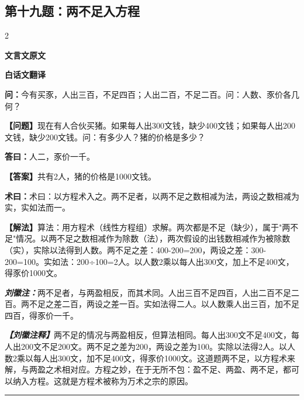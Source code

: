 \documentclass[10pt,a4paper]{article}
\newcommand{\wen}[1]{\textbf{\color{problemcolor}问：}#1\par}
\newcommand{\da}[1]{\textbf{答曰：}#1\par}
\newcommand{\shu}[1]{\textbf{术曰：}#1\par}
\newcommand{\liuhui}[1]{{\color{commentarycolor}\textit{\textbf{刘徽注：}}#1\par}}
\newcommand{\classicalheader}[1]{{\centering\large\bfseries\color{classicalcolor} #1\par\vspace{0.5em}}}
\newcommand{\wenmodern}[1]{\textbf{\color{moderncolor}【问题】}#1\par}
\newcommand{\damodern}[1]{\textbf{【答案】}#1\par}
\newcommand{\shumodern}[1]{\textbf{【解法】}#1\par}
\newcommand{\liuhuimodern}[1]{{\color{commentarycolor}\textit{\textbf{【刘徽注释】}}#1\par}}
\newcommand{\modernheader}[1]{{\centering\large\bfseries\color{moderncolor} #1\par\vspace{0.5em}}}
\newcommand{\problemsec}[1]{\subsection*{#1}}
\begin{document}
\problemsec{第十九题：两不足入方程}
\begin{paracol}{2}
\classicalheader{文言文原文}
\switchcolumn
\modernheader{白话文翻译}
\switchcolumn*

\wen{今有买豕，人出三百，不足四百；人出二百，不足二百。问：人数、豕价各几何？}

\switchcolumn

\wenmodern{现在有人合伙买猪。如果每人出300文钱，缺少400文钱；如果每人出200文钱，缺少200文钱。问：有多少人？猪的价格是多少？}

\switchcolumn*

\da{人二，豕价一千。}

\switchcolumn

\damodern{共有2人，猪的价格是1000文钱。}

\switchcolumn*

\shu{术曰：以方程术入之。两不足者，以两不足之数相减为法，两设之数相减为实，实如法而一。}

\switchcolumn

\shumodern{算法：用方程术（线性方程组）求解。两次都是不足（缺少），属于"两不足"情况。以两不足之数相减作为除数（法），两次假设的出钱数相减作为被除数（实），实除以法得到人数。两不足之差：400-200=200，两设之差：300-200=100。实如法：200÷100=2人。以人数2乘以每人出300文，加上不足400文，得豕价1000文。}

\switchcolumn*

\liuhui{两不足者，与两盈相反，而其术同。人出三百不足四百，人出二百不足二百。两不足之差二百，两设之差一百。实如法得二人。以人数乘人出三百，加不足四百，得豕价一千。}

\switchcolumn

\liuhuimodern{两不足的情况与两盈相反，但算法相同。每人出300文不足400文，每人出200文不足200文。两不足之差为200，两设之差为100。实除以法得2人。以人数2乘以每人出300文，加不足400文，得豕价1000文。这道题两不足，以方程术来解，与两盈之术相对应。方程之妙，在于无所不包：盈不足、两盈、两不足，都可以纳入方程。这就是方程术被称为万术之宗的原因。}

\end{paracol}

\vspace{0.3cm}
\hrule
\vspace{0.3cm}
\end{document}
